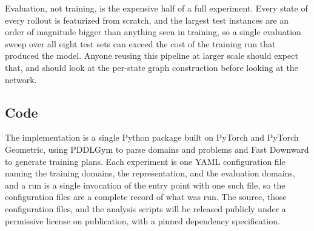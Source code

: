 \documentclass[letterpaper]{article}
\begin{document}
Evaluation, not training, is the expensive half of a full experiment. Every
state of every rollout is featurized from scratch, and the largest test
instances are an order of magnitude bigger than anything seen in training, so
a single evaluation sweep over all eight test sets can exceed the cost of the
training run that produced the model. Anyone reusing this pipeline at larger
scale should expect that, and should look at the per-state graph construction
before looking at the network.

\subsection{Code}
\label{app:code}

The implementation is a single Python package built on PyTorch and PyTorch
Geometric, using PDDLGym to parse domains and problems and Fast Downward
\citep{fast_downward} to generate training plans. Each experiment is one YAML
configuration file naming the training domains, the representation, and the
evaluation domains, and a run is a single invocation of the entry point with
one such file, so the configuration files are a complete record of what was
run. The source, those configuration files, and the analysis scripts will be
released publicly under a permissive license on publication, with a pinned
dependency specification.

\ifappendixStandalone

\end{document}
